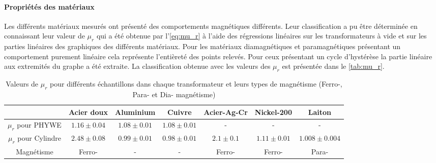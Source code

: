 \paragraph{Propriétés des matériaux}
Les différents matériaux mesurés ont présenté des comportements magnétiques différents. Leur classification a pu être déterminée en connaissant leur valeur de \(\mu_r\) qui a été obtenue par l'\autoref{eq:mu_r} à l'aide des régressions linéaires sur les transformateurs à vide et sur les parties linéaires des graphiques des différents matériaux. Pour les matériaux diamagnétiques et paramagnétiques présentant un comportement purement linéaire cela représente l'entièreté des points relevés. Pour ceux présentant un cycle d'hystérèse la partie linéaire aux extremités du graphe a été extraite. La classification obtenue avec les valeurs des \(\mu_r\) est présentée dans le \autoref{tab:mu_r}.

\begin{table}[h]
    \vspace{5pt}
    \centering
    \begin{adjustbox}{width=\textwidth}
        \begin{tabulary}{\linewidth}{|c c c c c c c|}
            \toprule
            & Acier doux & Aluminium & Cuivre & Acier-Ag-Cr & Nickel-200 & Laiton \\
            \midrule
            \(\mu_r\) pour PHYWE & \(1.16 \pm 0.04\) & \(1.08 \pm 0.01\) & \(1.08 \pm 0.01\) & - & - & - \\
            \(\mu_r\) pour Cylindre & \(2.48 \pm 0.08\) & \(0.99 \pm 0.01\) & \(0.98 \pm 0.01\) & \(2.1 \pm 0.1\) & \(1.11 \pm 0.01\) & \(1.008 \pm 0.004\) \\
            Magnétisme & Ferro- & - & - & Ferro- & Ferro- & Para- \\
            \bottomrule
        \end{tabulary}
    \end{adjustbox}
    \caption{Valeurs de \(\mu_r\) pour différents échantillons dans chaque transformateur et leurs types de magnétisme (Ferro-, Para- et Dia- magnétisme)}
    \label{tab:mu_r}
\end{table}


